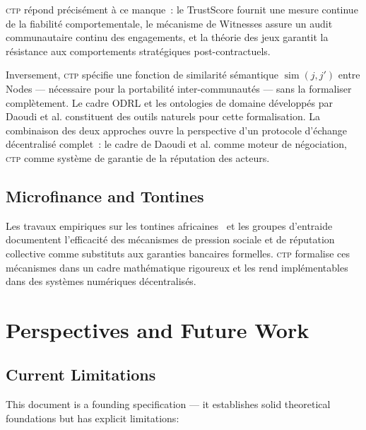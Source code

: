 \documentclass[12pt,a4paper]{article}
\theoremstyle{definition}
\theoremstyle{plain}
\theoremstyle{remark}
\newcommand{\CTP}{\textsc{ctp}}
\newcommand{\1}{\mathbf{1}}
\begin{document}
\CTP{} répond précisément à ce manque~: le TrustScore fournit une mesure
continue de la fiabilité comportementale, le mécanisme de Witnesses assure
un audit communautaire continu des engagements, et la théorie des jeux
garantit la résistance aux comportements stratégiques post-contractuels.

Inversement, \CTP{} spécifie une fonction de similarité sémantique
$\operatorname{sim}(j, j')$ entre Nodes --- nécessaire pour la portabilité
inter-communautés --- sans la formaliser complètement. Le cadre ODRL et les
ontologies de domaine développés par Daoudi et al. constituent des outils
naturels pour cette formalisation. La combinaison des deux approches ouvre
la perspective d'un protocole d'échange décentralisé complet~: le cadre
de Daoudi et al. comme moteur de négociation, \CTP{} comme système de
garantie de la réputation des acteurs.

\subsection{Microfinance and Tontines}

Les travaux empiriques sur les tontines africaines~\cite{ardener1964rotating}
et les groupes d'entraide~\cite{besley1993rotating} documentent l'efficacité
des mécanismes de pression sociale et de réputation collective comme
substituts aux garanties bancaires formelles. \CTP{} formalise ces mécanismes
dans un cadre mathématique rigoureux et les rend implémentables dans des
systèmes numériques décentralisés.

\section{Perspectives and Future Work}
\label{sec:conclusion}

\subsection{Current Limitations}

This document is a founding specification --- it establishes solid
theoretical foundations but has explicit limitations:
\end{document}
